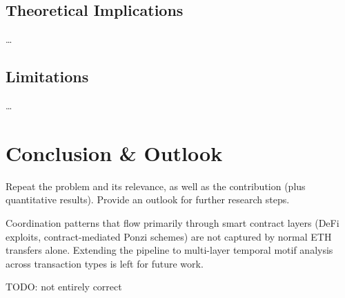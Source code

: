 \documentclass{thesisclass}
\begin{document}
\section{Theoretical Implications}\dots

\section{Limitations}\dots


\chapter{Conclusion \& Outlook} Repeat the problem and its relevance, as well as the contribution (plus quantitative results). Provide an outlook for further research steps.



Coordination patterns that flow primarily through smart contract layers (DeFi exploits,
 contract-mediated Ponzi schemes) are not captured by normal ETH transfers alone. Extending
 the pipeline to multi-layer temporal motif analysis across transaction types is left for future
 work.

 TODO: not entirely correct




 




{}
{}




												  


\end{document}
